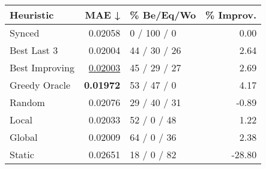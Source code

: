 \begin{tabular}{lrlr}
\toprule
\textbf{Heuristic} & \textbf{MAE ↓} & \textbf{\% Be/Eq/Wo} & \textbf{\% Improv.} \\
\midrule
            Synced &        0.02058 &          0 / 100 / 0 &                0.00 \\
\midrule
       Best Last 3 &        0.02004 &         44 / 30 / 26 &                2.64 \\
    Best Improving &        \underline{0.02003} &         45 / 29 / 27 &                2.69 \\
\addlinespace
     Greedy Oracle &        \textbf{0.01972} &          53 / 47 / 0 &                4.17 \\
            Random &        0.02076 &         29 / 40 / 31 &               -0.89 \\
\midrule
             Local &        0.02033 &          52 / 0 / 48 &                1.22 \\
            Global &        0.02009 &          64 / 0 / 36 &                2.38 \\
\midrule
            Static &        0.02651 &          18 / 0 / 82 &              -28.80 \\
\bottomrule
\end{tabular}

\label{tab:iid_lr01_le2_bs2_Summary}
